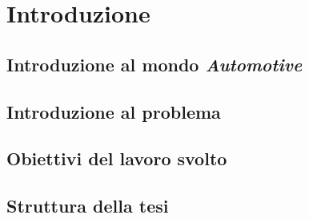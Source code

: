 \chapter{Introduzione}

\section{Introduzione al mondo \emph{Automotive}}

\section{Introduzione al problema}

\section{Obiettivi del lavoro svolto} %

\section{Struttura della tesi}

